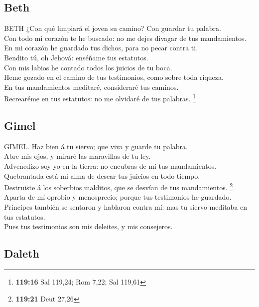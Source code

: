 \hypertarget{beth}{%
\subsection{Beth}\label{beth}}

 BETH ¿Con qué limpiará el joven su camino? Con guardar tu
palabra.\\
 Con todo mi corazón te he buscado: no me dejes divagar
de tus mandamientos.\\
 En mi corazón he guardado tus dichos, para no pecar
contra ti.\\
 Bendito tú, oh Jehová: enséñame tus estatutos.\\
 Con mis labios he contado todos los juicios de tu
boca.\\
 Heme gozado en el camino de tus testimonios, como sobre
toda riqueza.\\
 En tus mandamientos meditaré, consideraré tus caminos.\\
 Recrearéme en tus estatutos: no me olvidaré de tus
palabras. \footnote{\textbf{119:16} Sal 119,24; Rom 7,22; Sal 119,61}

\hypertarget{gimel}{%
\subsection{Gimel}\label{gimel}}

 GIMEL. Haz bien á tu siervo; que viva y guarde tu
palabra.\\
 Abre mis ojos, y miraré las maravillas de tu ley.\\
 Advenedizo soy yo en la tierra: no encubras de mí tus
mandamientos.\\
 Quebrantada está mi alma de desear tus juicios en todo
tiempo.\\
 Destruiste á los soberbios malditos, que se desvían de
tus mandamientos. \footnote{\textbf{119:21} Deut 27,26}\\
 Aparta de mí oprobio y menosprecio; porque tus
testimonios he guardado.\\
 Príncipes también se sentaron y hablaron contra mí: mas
tu siervo meditaba en tus estatutos.\\
 Pues tus testimonios son mis deleites, y mis consejeros.

\hypertarget{daleth}{%
\subsection{Daleth}\label{daleth}}

